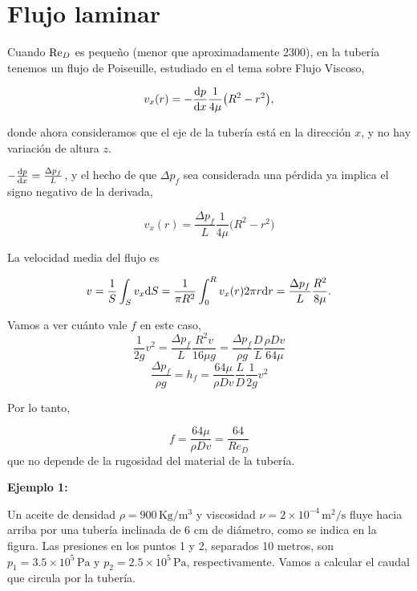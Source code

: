 \begin{center}
\end{center}

\section{Flujo laminar}
Cuando $\text{Re}_D$ es pequeño (menor que aproximadamente 2300), en la tubería tenemos un flujo de Poiseuille, estudiado en el tema sobre Flujo Viscoso,

\begin{equation}
	v_x(r) = -\frac{\textrm{d} p}{\textrm{d} x}\frac{1}{4\mu}\bigl(R^2 - r^2\bigr),
\end{equation}

donde ahora consideramos que el eje de la tubería está en la dirección $x$, y no hay variación de altura $z$.

$-\frac{\textrm{d} p}{\textrm{d} x} = \frac{\Delta p_f}{L}$, y el hecho de que $\Delta p_f$ sea considerada una pérdida ya implica el signo negativo de la derivada,

\begin{equation}
	v_x(r) =  \frac{\Delta p_f}{L}\frac{1}{4\mu}\bigl(R^2 - r^2\bigr)
\end{equation}


La velocidad media del flujo es

\begin{equation}
	v = \frac{1}{S}\int_S v_x \text{d} S = \frac{1}{\pi R^2}\int_0^R v_x(r) 2\pi r \text{d} r = \frac{\Delta p_f}{L}\frac{R^2}{8\mu}.
\end{equation}

Vamos a ver cuánto vale $f$ en este caso,
\[\frac{1}{2g}v^2 = \frac{\Delta p_f}{L}\frac{R^2 v}{16\mu g} = \frac{\Delta p_f}{\rho g}\frac{D}{L}\frac{ \rho D v}{64\mu}\]
\[\frac{\Delta p_f}{\rho g} = h_f =\frac{64\mu}{ \rho D v}\frac{L}{D}\frac{1}{2g}v^2 \]

Por lo tanto,

\begin{equation}
	\boxed{
	f=\frac{64\mu}{ \rho D v} = \frac{64}{Re_D}
}
\end{equation}
que no depende de la rugosidad del material de la tubería.

\textbf{Ejemplo 1: }

Un aceite de densidad $\rho = 900 \,\text{Kg}/\text{m}^3$ y viscosidad $\nu = 2\times 10^{-4} \, \text{m}^2/\text{s}$ fluye hacia arriba por una tubería inclinada de 6 cm de diámetro, como se indica en la figura. Las presiones en los puntos 1 y 2, separados 10 metros, son $p_1 = 3.5\times10^5\,\text{Pa}$ y $p_2 = 2.5\times10^5\,\text{Pa}$, respectivamente. Vamos a calcular el caudal que circula por la tubería.

